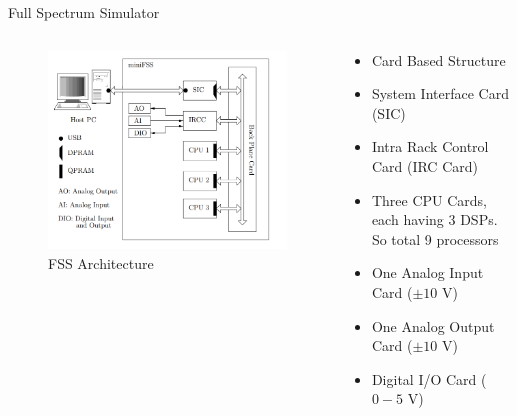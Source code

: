 \documentclass{beamer}
\begin{document}
\begin{frame}{Full Spectrum Simulator}
\begin{columns}
\begin{column}{0.5\textwidth}
\begin{figure}
\includegraphics[width=\columnwidth]{fig/fss_arch2.png}
\caption{FSS Architecture}
\end{figure}
\end{column}
\begin{column}{0.5\textwidth}
\begin{itemize}
\item Card Based Structure
\item System Interface Card (SIC)
\item Intra Rack Control Card (IRC Card)
\item Three CPU Cards, each having 3 DSPs. So total 9 processors
\item One Analog Input Card ($\pm 10$ V)
\item One Analog Output Card ($\pm 10$ V)
\item Digital I/O Card ($0-5$ V)
\end{itemize}
\end{column}
\end{columns}
\end{frame}   

\end{document}
